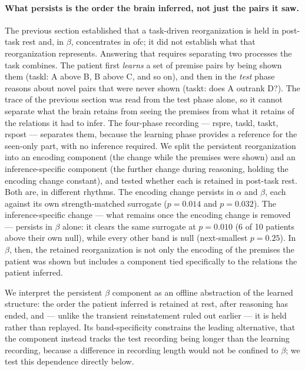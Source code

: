 \paragraph{What persists is the order the brain inferred, not just the pairs it saw.}
The previous section established that a task-driven reorganization is held in post-task rest and, in \(\beta\), concentrates in \gls{ofc}; it did not establish what that reorganization represents. Answering that requires separating two processes the task combines. The patient first \emph{learns} a set of premise pairs by being shown them (\acrshort{taskl}: A above B, B above C, and so on), and then in the \emph{test} phase reasons about novel pairs that were never shown (\acrshort{taskt}: does A outrank D?). The trace of the previous section was read from the test phase alone, so it cannot separate what the brain retains from seeing the premises from what it retains of the relations it had to infer. The four-phase recording --- \acrshort{rspre}, \acrshort{taskl}, \acrshort{taskt}, \acrshort{rspost} --- separates them, because the learning phase provides a reference for the seen-only part, with no inference required. We split the persistent reorganization into an encoding component (the change while the premises were shown) and an inference-specific component (the further change during reasoning, holding the encoding change constant), and tested whether each is retained in post-task rest. Both are, in different rhythms. The encoding change persists in \(\alpha\) and \(\beta\), each against its own strength-matched surrogate (\(p = 0.014\) and \(p = 0.032\)). The inference-specific change --- what remains once the encoding change is removed --- persists in \(\beta\) alone: it clears the same surrogate at \(p = 0.010\) (6 of 10 patients above their own null), while every other band is null (next-smallest \(p = 0.25\)). In \(\beta\), then, the retained reorganization is not only the encoding of the premises the patient was shown but includes a component tied specifically to the relations the patient inferred.

We interpret the persistent \(\beta\) component as an offline abstraction of the learned structure: the order the patient inferred is retained at rest, after reasoning has ended, and --- unlike the transient reinstatement ruled out earlier --- it is held rather than replayed. Its band-specificity constrains the leading alternative, that the component instead tracks the test recording being longer than the learning recording, because a difference in recording length would not be confined to \(\beta\); we test this dependence directly below.
